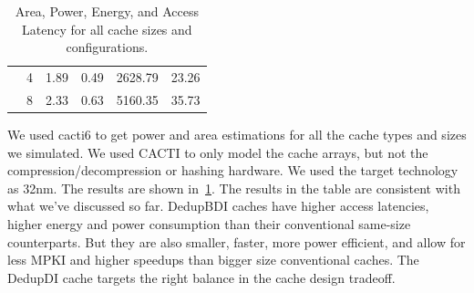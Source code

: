 \begin{table}[]
{\begin{tabular}{llllll}
    \multicolumn{1}{c|}{}                          & \multicolumn{1}{l|}{4}   & 1.89                                                                          & 0.49                                                                               & 2628.79                                                                         & 23.26                      \\
    \multicolumn{1}{c|}{}                          & \multicolumn{1}{l|}{8}   & 2.33                                                                          & 0.63                                                                                & 5160.35                                                                         & 35.73                      \\ \cline{1-2}
    \end{tabular}%
    }
    \caption{Area, Power, Energy, and Access Latency for all cache sizes and configurations.}
    \label{tab:areapower}
\end{table}
We used cacti6\cite{cacti} to get power and area estimations for all the cache types and sizes we simulated. We used CACTI to only model the cache arrays, but not the compression/decompression or hashing hardware. We used the target technology as 32nm. The results are shown in~\ref{tab:areapower}. The results in the table are consistent with what we've discussed so far. DedupBDI caches have higher access latencies, higher energy and power consumption than their conventional same-size counterparts. But they are also smaller, faster, more power efficient, and allow for less MPKI and higher speedups than bigger size conventional caches. The DedupDI cache targets the right balance in the cache design tradeoff.